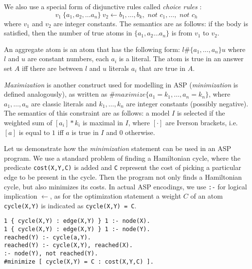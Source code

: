 We also use a special form of disjunctive rules called \textit{choice rules} \parencite{ASPbook}:
\begin{equation*}
  v_1~\{ a_1, a_2, \dots a_n \}~v_2 \leftarrow b_1, \dots, b_k, \textit{ not }c_1,\dots,\textit{ not }c_h
\end{equation*}
where $v_1$ and $v_2$ are integer constants. The semantics are as follows: if the body is satisfied, then the number of true atoms in $\{ a_1, a_2 \dots a_n \}$ is from $v_1$ to $v_2$.

An aggregate atom is an atom that has the following form: $l \# \{ a_1, \dots ,a_n \} u$
where $l$ and $u$ are constant numbers, each $a_i$ is a literal. \pubrev The atom is true in an answer set $A$ iff there are between $l$ and $u$ literals $a_i$ that are true in $A$. 

\textit{Maximization} is another construct used for modelling in ASP \parencite{ASPbook, leone} (\textit{minimization} is defined analogously), as written as $\#\textit{maximize}\{ a_1=k_1, \dots, a_n=k_n \}$, 
where $a_1, \dots, a_n$ are classic literals and $k_1, \dots, k_n$ are integer constants (possibly negative). The semantics of this constraint are as follows: a model $I$ is selected if the weighted sum of $[a_i]*k_i$ is maximal in $I$, where $[\cdot]$ are Iverson brackets, i.e. $[a]$ is equal to $1$ iff $a$ is true in $I$ and $0$ otherwise. \pubrevend

\begin{example}
    \pubrev
    Let us demonstrate how the \textit{minimization} statement can be used in an ASP program. We use a standard problem of finding a Hamiltonian cycle, where the predicate \texttt{cost(X,Y,C)} is added and \texttt{C} represent the cost of picking a particular edge to be present in the cycle. Then the program not only finds a Hamiltonian cycle, but also minimizes its costs. In actual ASP encodings, we use \texttt{:-} for logical implication $\leftarrow$, as for the optimization statement a weight $C$ of an atom \texttt{cycle(X,Y)} is indicated as \texttt{cycle(X,Y) = C}.
\begin{minipage}{\linewidth}
    \begin{lstlisting}[caption=ASP encoding of the Hamiltonian cycle problem (due to \textcite{ASPbook}), label=lst:example_asp_coloring,basicstyle=\ttfamily]
1 { cycle(X,Y) : edge(X,Y) } 1 :- node(X). 
1 { cycle(X,Y) : edge(X,Y) } 1 :- node(Y).
reached(Y) :- cycle(a,Y).
reached(Y) :- cycle(X,Y), reached(X).
:- node(Y), not reached(Y).
#minimize [ cycle(X,Y) = C : cost(X,Y,C) ].
\end{lstlisting}
\end{minipage}
\pubrevend
\end{example}

